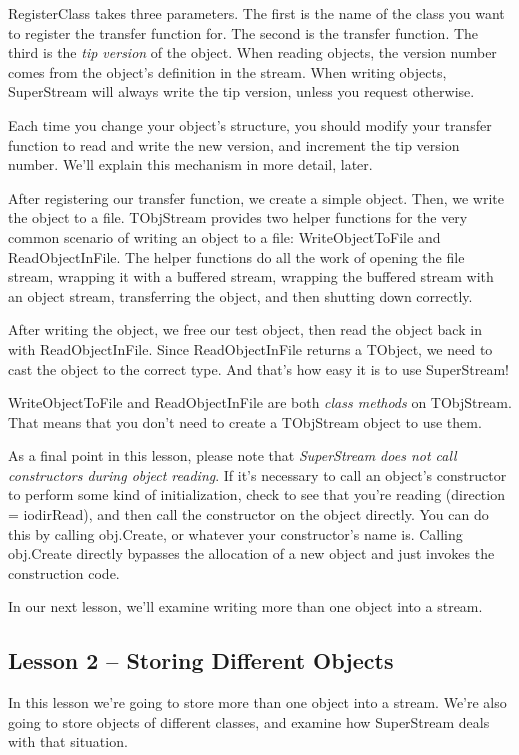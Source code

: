 \documentclass{report}
\begin{document}
RegisterClass takes three parameters. The first is the name of the class you
want to register the transfer function for. The second is the transfer
function.  The third is the \emph{tip version } of the object. When reading
objects, the version number comes from the object's definition in the
stream. When writing objects, SuperStream will always write the tip version,
unless you request otherwise.

Each time you change your object's structure, you should modify your
transfer function to read and write the new version, and increment the tip
version number. We'll explain this mechanism in more detail, later.

After registering our transfer function, we create a simple object.  Then,
we write the object to a file. TObjStream provides two helper functions for
the very common scenario of writing an object to a file: WriteObjectToFile
and ReadObjectInFile.  The helper functions do all the work of opening the
file stream, wrapping it with a buffered stream, wrapping the buffered
stream with an object stream, transferring the object, and then shutting
down correctly.

After writing the object, we free our test object, then read the object back
in with ReadObjectInFile. Since ReadObjectInFile returns a TObject, we need
to cast the object to the correct type. And that's how easy it is to use
SuperStream!

WriteObjectToFile and ReadObjectInFile are both \emph{class methods }
on TObjStream. That
means that you don't need to create a TObjStream object to use 
them.

As a final point in this lesson, please note that \emph{SuperStream does not
call constructors during object reading}. If it's necessary to call an
object's constructor to perform some kind of initialization, check to see
that you're reading (direction = iodirRead), and then call the constructor
on the object directly. You can do this by calling obj.Create, or whatever
your constructor's name is. Calling obj.Create directly bypasses the
allocation of a new object and just invokes the construction code.

In our next lesson, we'll examine writing more than one object 
into a stream.

\subsection{Lesson 2 -- Storing Different Objects}

In this lesson we're going to store more than one object 
into a stream. We're also going to
store objects of different classes, and examine how SuperStream 
deals with that situation.
\end{document}
